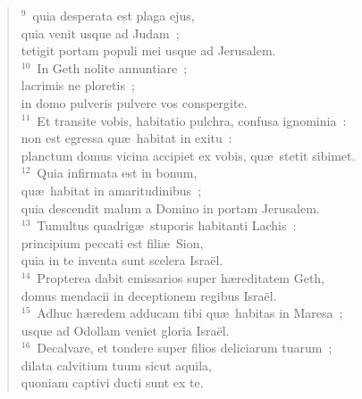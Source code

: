 \begin{flushleft}
\begin{verse}
${}^{9}$~quia desperata est plaga ejus,\\ quia venit usque ad Judam~;\\ tetigit portam populi mei usque ad Jerusalem.\\
${}^{10}$~In Geth nolite annuntiare~;\\ lacrimis ne ploretis~;\\ in domo pulveris pulvere vos conspergite.\\
${}^{11}$~Et transite vobis, habitatio pulchra, confusa ignominia~:\\ non est egressa qu\ae\ habitat in exitu~:\\ planctum domus vicina accipiet ex vobis, qu\ae\ stetit sibimet.\\
${}^{12}$~Quia infirmata est in bonum,\\ qu\ae\ habitat in amaritudinibus~;\\ quia descendit malum a Domino in portam Jerusalem.\\
${}^{13}$~Tumultus quadrig\ae\ stuporis habitanti Lachis~:\\ principium peccati est fili\ae\ Sion,\\ quia in te inventa sunt scelera Isra\"el.\\
${}^{14}$~Propterea dabit emissarios super h\ae reditatem Geth,\\ domus mendacii in deceptionem regibus Isra\"el.\\
${}^{15}$~Adhuc h\ae redem adducam tibi qu\ae\ habitas in Maresa~;\\ usque ad Odollam veniet gloria Isra\"el.\\
${}^{16}$~Decalvare, et tondere super filios deliciarum tuarum~;\\ dilata calvitium tuum sicut aquila,\\ quoniam captivi ducti sunt ex te.\end{verse}\end{flushleft}


